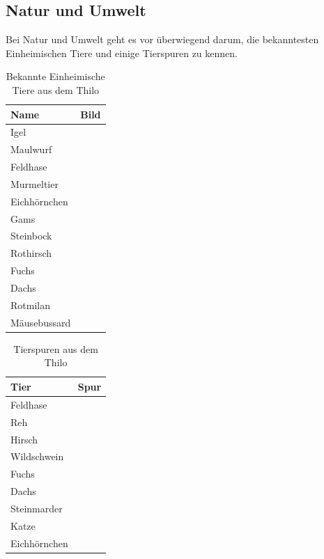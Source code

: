 \subsection*{Natur und Umwelt}
Bei Natur und Umwelt geht es vor überwiegend darum, die bekanntesten Einheimischen Tiere und einige Tierspuren zu kennen.
\begin{table}[h]
    \centering
    \begin{tabularx}{0.6\textwidth}{X|X}
        \textbf{Name} & \textbf{Bild}  \\\hline
        Igel & \\\hline
        Maulwurf & \\\hline
        Feldhase & \\\hline
        Murmeltier & \\\hline
        Eichhörnchen & \\\hline
        Gams & \\\hline
        Steinbock & \\\hline
        Rothirsch & \\\hline
        Fuchs & \\\hline
        Dachs & \\\hline
        Rotmilan & \\\hline
        Mäusebussard & \\
    \end{tabularx}
    \caption{Bekannte Einheimische Tiere aus dem Thilo}
    \label{tab:my_label}
\end{table}
\newpage
\begin{table}[h]
    \centering
    \begin{tabularx}{0.6\textwidth}{X|X}
        \textbf{Tier} & \textbf{Spur} \\\hline
        Feldhase & \\\hline
        Reh & \\\hline
        Hirsch & \\\hline
        Wildschwein & \\\hline
        Fuchs & \\\hline
        Dachs & \\\hline
        Steinmarder & \\\hline
        Katze & \\\hline
        Eichhörnchen & \\
    \end{tabularx}
    \caption{Tierspuren aus dem Thilo}
    \label{tab:my_label}
\end{table}

